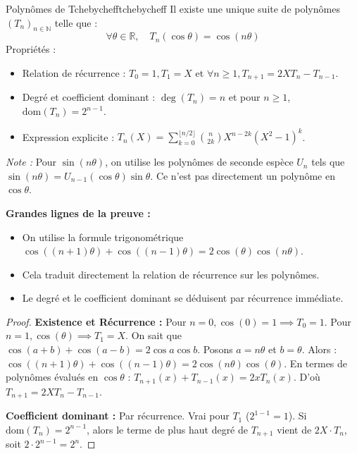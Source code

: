 \documentclass{prepacours}
\begin{document}
\begin{proposition}{Polynômes de Tchebycheff}{tchebycheff}
    Il existe une unique suite de polynômes $(T_n)_{n \in \mathbb{N}}$ telle que :
    \[ \forall \theta \in \mathbb{R}, \quad T_n(\cos \theta) = \cos(n\theta) \]
    Propriétés :
    \begin{itemize}
        \item Relation de récurrence : $T_0 = 1, T_1 = X$ et $\forall n \ge 1, T_{n+1} = 2X T_n - T_{n-1}$.
        \item Degré et coefficient dominant : $\deg(T_n) = n$ et pour $n \ge 1$, $\text{dom}(T_n) = 2^{n-1}$.
        \item Expression explicite : $T_n(X) = \sum_{k=0}^{\lfloor n/2 \rfloor} \binom{n}{2k} X^{n-2k} (X^2-1)^k$.
    \end{itemize}
    \textit{Note :} Pour $\sin(n\theta)$, on utilise les polynômes de seconde espèce $U_n$ tels que $\sin(n\theta) = U_{n-1}(\cos \theta)\sin \theta$. Ce n'est pas directement un polynôme en $\cos \theta$.
\end{proposition}

\noindent \textbf{Grandes lignes de la preuve :}
\begin{itemize}
    \item On utilise la formule trigonométrique $\cos((n+1)\theta) + \cos((n-1)\theta) = 2\cos(\theta)\cos(n\theta)$.
    \item Cela traduit directement la relation de récurrence sur les polynômes.
    \item Le degré et le coefficient dominant se déduisent par récurrence immédiate.
\end{itemize}

\begin{proof}
    \textbf{Existence et Récurrence :}
    Pour $n=0, \cos(0)=1 \implies T_0=1$. Pour $n=1, \cos(\theta) \implies T_1=X$.
    On sait que $\cos(a+b) + \cos(a-b) = 2\cos a \cos b$.
    Posons $a=n\theta$ et $b=\theta$. Alors :
    $\cos((n+1)\theta) + \cos((n-1)\theta) = 2\cos(n\theta)\cos(\theta)$.
    En termes de polynômes évalués en $\cos \theta$ : $T_{n+1}(x) + T_{n-1}(x) = 2x T_n(x)$.
    D'où $T_{n+1} = 2X T_n - T_{n-1}$.
    
    \textbf{Coefficient dominant :}
    Par récurrence. Vrai pour $T_1$ ($2^{1-1}=1$).
    Si $\text{dom}(T_n) = 2^{n-1}$, alors le terme de plus haut degré de $T_{n+1}$ vient de $2X \cdot T_n$, soit $2 \cdot 2^{n-1} = 2^n$.
\end{proof}
\end{document}

